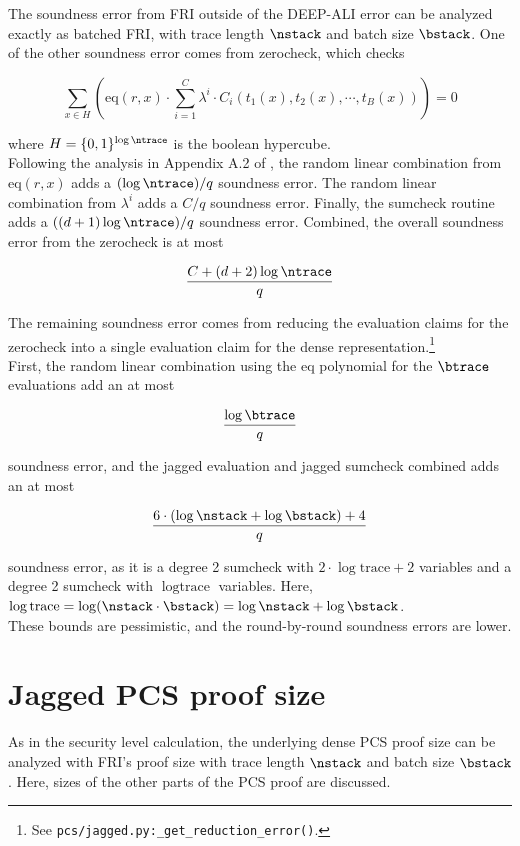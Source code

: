 The soundness error from FRI outside of the DEEP-ALI error can be analyzed exactly as batched FRI, with trace length $\nstack$ and batch size $\bstack$.
One of the other soundness error comes from zerocheck, which checks

$$\sum_{x \in H} \left( \text{eq}(r, x) \cdot \sum_{i=1}^C \lambda^i \cdot C_i(t_1(x), t_2(x), \cdots, t_B(x)) \right) = 0$$

where $H = \{0, 1\}^{\log \ntrace}$ is the boolean hypercube. \\

Following the analysis in Appendix A.2 of \cite{cryptoeprint:2024/108}, the random linear combination from $\text{eq}(r, x)$ adds a $(\log \ntrace) / q$ soundness error. The random linear combination from $\lambda^i$ adds a $C / q$ soundness error. Finally, the sumcheck routine adds a $((d + 1) \log \ntrace) / q$ soundness error.
Combined, the overall soundness error from the zerocheck is at most

$$\frac{C + (d + 2) \log \ntrace}{q}$$

The remaining soundness error comes from reducing the evaluation claims for the zerocheck into a single evaluation claim for the dense representation.\footnote{See \texttt{pcs/jagged.py:\_get\_reduction\_error()}.}\\

First, the random linear combination using the $\text{eq}$ polynomial for the $\btrace$ evaluations add an at most

$$\frac{\log \btrace}{q}$$

soundness error, and the jagged evaluation and jagged sumcheck combined adds an at most

$$\frac{6 \cdot (\log \nstack + \log \bstack) + 4}{q}$$

soundness error, as it is a degree 2 sumcheck with $2 \cdot \log \text{trace} + 2$ variables and a degree 2 sumcheck with $\log \text{trace}$ variables.
Here, $\log \text{trace} = \log (\nstack \cdot \bstack) = \log \nstack + \log \bstack$. \\

These bounds are pessimistic, and the round-by-round soundness errors are lower.

\newpage
\section{Jagged PCS proof size}

As in the security level calculation, the underlying dense PCS proof size can be analyzed with FRI's proof size with trace length $\nstack$ and batch size $\bstack$. Here, sizes of the other parts of the PCS proof are discussed.

